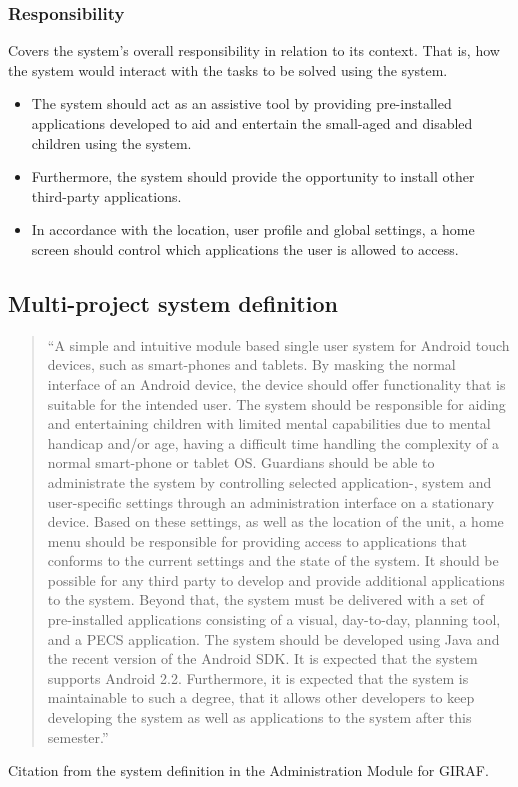 \subsubsection{Responsibility} 
Covers the system's overall responsibility in relation to its context. That is, how the system would interact with the tasks to be solved using the system.
\begin{itemize}
	\item The system should act as an assistive tool by providing pre-installed applications developed to aid and entertain the small-aged and disabled children using the system. 
	\item Furthermore, the system should provide the opportunity to install other third-party applications. 
	\item In accordance with the location, user profile and global settings, a home screen should control which applications the user is allowed to access.
\end{itemize}

\subsection{Multi-project system definition}

\begin{quotation}
``A simple and intuitive module based single user system for Android touch devices, such as smart-phones and tablets. By masking the normal interface of an Android device, the device should offer functionality that is suitable for the intended user.
The system should be responsible for aiding and entertaining children with limited mental capabilities due to mental handicap and/or age, having a difficult time handling the complexity of a normal smart-phone or tablet OS. Guardians should be able to administrate the system by controlling selected application-, system and user-specific settings through an administration interface on a stationary device. Based on these settings, as well as the location of the unit, a home menu should be responsible for providing access to applications that conforms to the current settings and the state of the system. It should be possible for any third party to develop and provide additional applications to the system. Beyond that, the system must be delivered with a set of pre-installed applications consisting of a visual, day-to-day, planning tool, and a PECS application. The system should be developed using Java and the recent version of the Android SDK. It is expected that the system supports Android 2.2. Furthermore, it is expected that the system is maintainable to such a degree, that it allows other developers to keep developing the system as well as applications to the system after this semester.''
\end{quotation}
\caption{Citation from the system definition in the Administration Module for GIRAF.\cite{giraffactors}}

